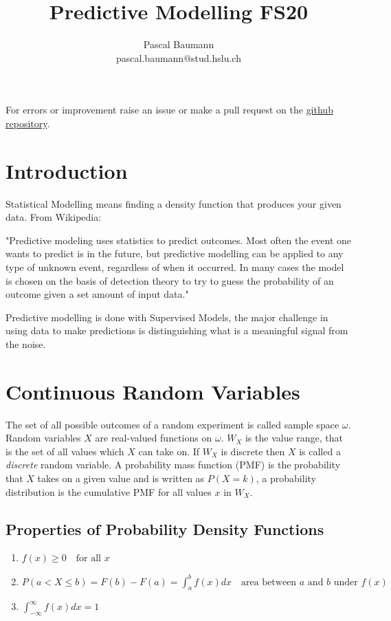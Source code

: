 \documentclass[11pt]{article}
\theoremstyle{definition}
\begin{document}
	
\title{Predictive Modelling FS20}
\author{Pascal Baumann\\pascal.baumann@stud.hslu.ch}
\maketitle



For errors or improvement raise an issue or make a pull request on the \href{https://github.com/KilnOfTheSecondFlame/mse_summaries}{github repository}.

\tableofcontents
\newpage



\section{Introduction}
Statistical Modelling means finding a density function that produces your given data. From Wikipedia:

"Predictive modeling uses statistics to predict outcomes. Most often the event one wants to predict is in the future, but predictive modelling can be applied to any type of unknown event, regardless of when it occurred. In many cases the model is chosen on the basis of detection theory to try to guess the probability of an outcome given a set amount of input data."

Predictive modelling is done with Supervised Models, the major challenge in using data to make predictions is distinguishing what is a meaningful signal from the noise.

\section{Continuous Random Variables}
The set of all possible outcomes of a random experiment is called sample space $\omega$. Random variables $X$ are real-valued functions on $\omega$. $W_X$ is the value range, that is the set of all values which $X$ can take on. If $W_X$ is discrete then $X$ is called a \emph{discrete} random variable. A probability mass function (PMF) is the probability that $X$ takes on a given value and is written as $P(X=k)$, a probability distribution is the cumulative PMF for all values $x$ in $W_X$.

\subsection{Properties of Probability Density Functions}
\begin{enumerate}
	\item $f(x) \geq 0\quad \text{for all }x$
	\item $P(a<X\leq b) = F(b) - F(a) = \int_{a}^{b}f(x) dx\quad \text{area between }a \text{ and }b \text{ under }f(x)$
	\item $ \int_{-\infty}^{\infty}f(x) dx = 1$
\end{enumerate}
\end{document}
